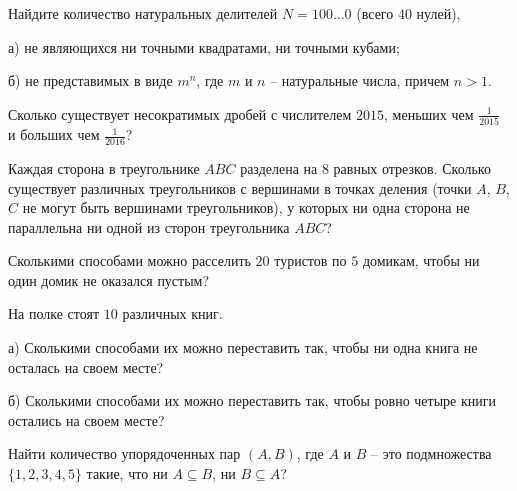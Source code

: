 \resetproblem \begingroup %
    \def\jeolmdate{9 ноября 2018 г.}%
\jeolmheader \endgroup


\begin{problems}

\item Найдите количество натуральных делителей $N=100\ldots0$ (всего $40$ нулей), 

а) не являющихся ни точными квадратами, ни точными кубами;

б) не представимых в виде $m^n$, где $m$ и $n$ -- натуральные числа, причем $n>1$.

\item Сколько существует несократимых дробей с числителем $2015$, меньших чем $\frac{1}{2015}$ и больших чем $\frac{1}{2016}$?

\item Каждая сторона в треугольнике $ABC$ разделена на $8$ равных отрезков. Сколько существует различных треугольников с вершинами в точках деления (точки $A$, $B$, $C$ не могут быть вершинами треугольников), у которых ни одна сторона не параллельна ни одной из сторон треугольника $ABC$? 

\item Сколькими способами можно расселить $20$ туристов по $5$ домикам, чтобы ни один домик не оказался пустым?

\item На полке стоят $10$ различных книг. 

а) Сколькими способами их можно переставить так, чтобы ни одна книга не осталась на своем месте?

б) Сколькими способами их можно переставить так, чтобы ровно четыре книги остались на своем месте? 

\item Найти количество упорядоченных пар $(A,B)$, где $A$ и $B$ -- это подмножества $\{1,2,3,4,5\}$ такие, что ни $A \subseteq B$, ни $B \subseteq A$?


\end{problems}